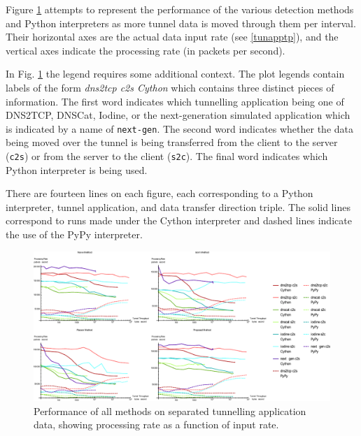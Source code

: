 \documentclass{llncs}
\begin{document}

Figure \ref{ppia-all} attempts
to represent the performance of the various
detection methods and Python interpreters as more tunnel data is moved through
them per interval. Their horizontal axes are the actual data input rate (see \ref{tunapptp}), and the vertical axes indicate the
processing rate (in packets per second).

In Fig. \ref{ppia-all} the legend requires some additional context. The
plot legends contain labels of the form \emph{dns2tcp c2s Cython} which contains
three distinct pieces of information. The first word indicates which tunnelling
application being one of DNS2TCP, DNSCat, Iodine, or the next-generation simulated application which is indicated by a name of \texttt{next-gen}. The
second word indicates whether the data being moved over the tunnel is being
transferred from the client to the server (\texttt{c2s}) or from the server to
the client (\texttt{s2c}). The final word indicates which Python interpreter is
being used.

There are fourteen lines on each figure, each corresponding to a Python
interpreter, tunnel application, and data transfer direction triple. The solid
lines correspond to runs made under the Cython interpreter and dashed lines
indicate the use of the PyPy interpreter.

\begin{figure}[h]
\centering
\includegraphics[width=\textwidth]{../figures/ppia-all.pdf}
\caption[Performance of Alls Method on Tunnel Data by Python
Interpreter]{Performance of all methods on separated tunnelling application
data, showing processing rate as a function of input rate.}
\label{ppia-all}
\end{figure}
\end{document}
